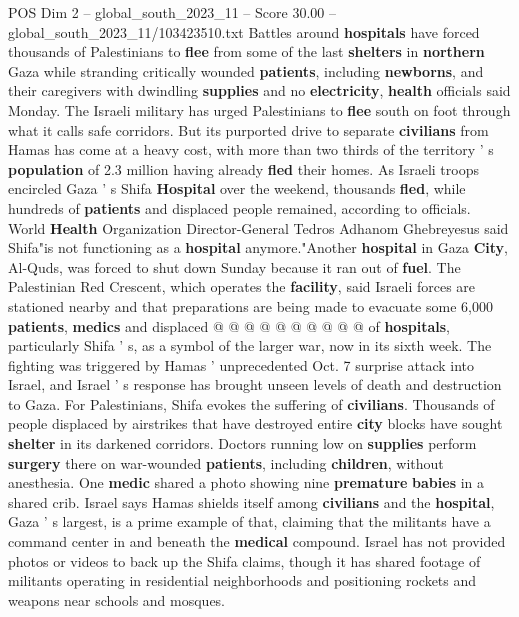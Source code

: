 \begin{textsample}{POS Dim 2 – global\_south\_2023\_11 – Score 30.00 – global\_south\_2023\_11/103423510.txt}  \label{ex:f2_pos_095}
Battles around \textbf{hospitals} have forced thousands of Palestinians to \textbf{flee} from some of the last \textbf{shelters} in \textbf{northern} Gaza while stranding critically wounded \textbf{patients}, including \textbf{newborns}, and their caregivers with dwindling \textbf{supplies} and no \textbf{electricity}, \textbf{health} officials said Monday.
The Israeli military has urged Palestinians to \textbf{flee} south on foot through what it calls safe corridors.
But its purported drive to separate \textbf{civilians} from Hamas has come at a heavy cost, with more than two thirds of the territory ' s \textbf{population} of 2.3 million having already \textbf{fled} their homes.
As Israeli troops encircled Gaza ' s Shifa \textbf{Hospital} over the weekend, thousands \textbf{fled}, while hundreds of \textbf{patients} and displaced people remained, according to officials.
World \textbf{Health} Organization Director-General Tedros Adhanom Ghebreyesus said Shifa"is not functioning as a \textbf{hospital} anymore."Another \textbf{hospital} in Gaza \textbf{City}, Al-Quds, was forced to shut down Sunday because it ran out of \textbf{fuel}.
The Palestinian Red Crescent, which operates the \textbf{facility}, said Israeli forces are stationed nearby and that preparations are being made to evacuate some 6,000 \textbf{patients}, \textbf{medics} and displaced @ @ @ @ @ @ @ @ @ @ of \textbf{hospitals}, particularly Shifa ' s, as a symbol of the larger war, now in its sixth week.
The fighting was triggered by Hamas ' unprecedented Oct. 7 surprise attack into Israel, and Israel ' s response has brought unseen levels of death and destruction to Gaza.
For Palestinians, Shifa evokes the suffering of \textbf{civilians}.
Thousands of people displaced by airstrikes that have destroyed entire \textbf{city} blocks have sought \textbf{shelter} in its darkened corridors.
Doctors running low on \textbf{supplies} perform \textbf{surgery} there on war-wounded \textbf{patients}, including \textbf{children}, without anesthesia.
One \textbf{medic} shared a photo showing nine \textbf{premature} \textbf{babies} in a shared crib.
Israel says Hamas shields itself among \textbf{civilians} and the \textbf{hospital}, Gaza ' s largest, is a prime example of that, claiming that the militants have a command center in and beneath the \textbf{medical} compound.
Israel has not provided photos or videos to back up the Shifa claims, though it has shared footage of militants operating in residential neighborhoods and positioning rockets and weapons near schools and mosques.

\end{textsample}
